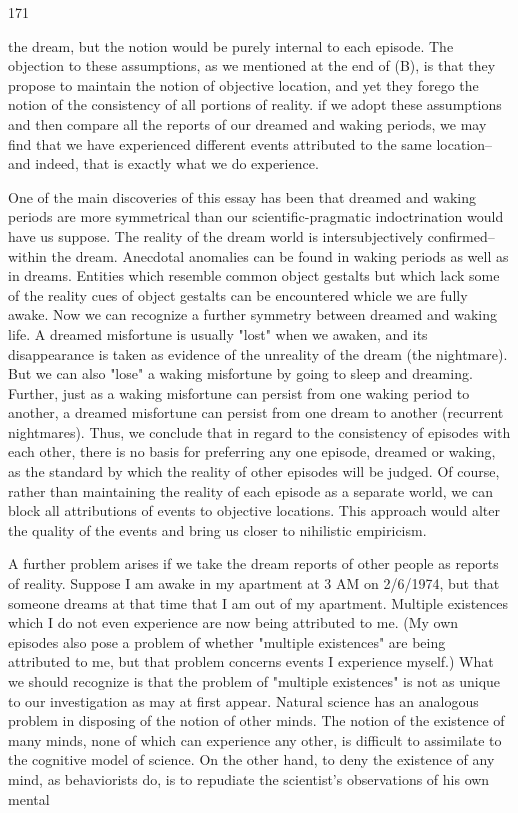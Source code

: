 \documentclass[10pt,twoside]{memoir}
\begin{document}
\begin{enumerate}
{{171 


the dream, but the notion would be purely internal to each episode. The 
objection to these assumptions, as we mentioned at the end of (B), is that 
they propose to maintain the notion of objective location, and yet they 
forego the notion of the consistency of all portions of reality. if we adopt 
these assumptions and then compare all the reports of our dreamed and 
waking periods, we may find that we have experienced different events 
attributed to the same location--and indeed, that is exactly what we do 
experience. 

One of the main discoveries of this essay has been that dreamed and 
waking periods are more symmetrical than our scientific-pragmatic 
indoctrination would have us suppose. The reality of the dream world is 
intersubjectively confirmed--within the dream. Anecdotal anomalies can be 
found in waking periods as well as in dreams. Entities which resemble 
common object gestalts but which lack some of the reality cues of object 
gestalts can be encountered whicle we are fully awake. Now we can 
recognize a further symmetry between dreamed and waking life. A dreamed 
misfortune is usually "lost" when we awaken, and its disappearance is taken 
as evidence of the unreality of the dream (the nightmare). But we can also 
"lose" a waking misfortune by going to sleep and dreaming. Further, just as 
a waking misfortune can persist from one waking period to another, a 
dreamed misfortune can persist from one dream to another (recurrent 
nightmares). Thus, we conclude that in regard to the consistency of episodes 
with each other, there is no basis for preferring any one episode, dreamed or 
waking, as the standard by which the reality of other episodes will be judged. 
Of course, rather than maintaining the reality of each episode as a separate 
world, we can block all attributions of events to objective locations. This 
approach would alter the quality of the events and bring us closer to 
nihilistic empiricism. 

A further problem arises if we take the dream reports of other people as 
reports of reality. Suppose I am awake in my apartment at 3 AM on 
2/6/1974, but that someone dreams at that time that I am out of my 
apartment. Multiple existences which I do not even experience are now being 
attributed to me. (My own episodes also pose a problem of whether 
"multiple existences" are being attributed to me, but that problem concerns 
events I experience myself.) What we should recognize is that the problem of 
"multiple existences" is not as unique to our investigation as may at first 
appear. Natural science has an analogous problem in disposing of the notion 
of other minds. The notion of the existence of many minds, none of which 
can experience any other, is difficult to assimilate to the cognitive model of 
science. On the other hand, to deny the existence of any mind, as 
behaviorists do, is to repudiate the scientist's observations of his own mental 


}}
\end{enumerate}
\end{document}
